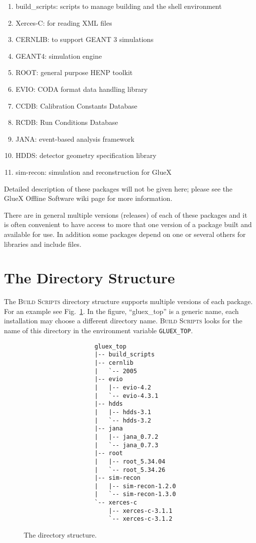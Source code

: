 \documentclass[12pt]{article}
\newcommand{\bs}{\textsc{Build Scripts}}
\begin{document}
\begin{enumerate}
\item build\_scripts: scripts to manage building and the shell environment
\item Xerces-C: for reading XML files
\item CERNLIB: to support GEANT 3 simulations
\item GEANT4: simulation engine
\item ROOT: general purpose HENP toolkit
\item EVIO: CODA format data handling library
\item CCDB: Calibration Constants Database
\item RCDB: Run Conditions Database
\item JANA: event-based analysis framework
\item HDDS: detector geometry specification library 
\item sim-recon: simulation and reconstruction for GlueX
\end{enumerate}

Detailed description of these packages will not be given here; please
see the GlueX Offline Software wiki page for more information.

There are in general multiple versions (releases) of each of these
packages and it is often convenient to have access to more that one
version of a package built and available for use. In addition some
packages depend on one or several others for libraries and include
files.

\section{The Directory Structure}\label{section:directory}

The \bs{} directory structure supports multiple versions of each
package. For an example see Fig.~\ref{fig:directory-tree}. In the
figure, ``gluex\_top'' is a generic name, each installation may choose
a different directory name. \bs{} looks for the name of this directory
in the environment variable {\tt GLUEX\_TOP}.

\begin{figure}
\begin{verbatim}
                    gluex_top
                    |-- build_scripts
                    |-- cernlib
                    |   `-- 2005
                    |-- evio
                    |   |-- evio-4.2
                    |   `-- evio-4.3.1
                    |-- hdds
                    |   |-- hdds-3.1
                    |   `-- hdds-3.2
                    |-- jana
                    |   |-- jana_0.7.2
                    |   `-- jana_0.7.3
                    |-- root
                    |   |-- root_5.34.04
                    |   `-- root_5.34.26
                    |-- sim-recon
                    |   |-- sim-recon-1.2.0
                    |   `-- sim-recon-1.3.0
                    `-- xerces-c
                        |-- xerces-c-3.1.1
                        `-- xerces-c-3.1.2
\end{verbatim}
\caption{The directory structure.}\label{fig:directory-tree}
\end{figure}
\end{document}
